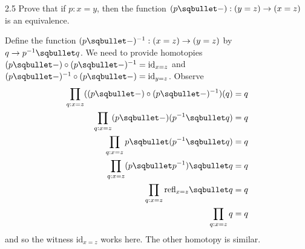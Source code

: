 \documentclass[14pt]{extarticle}
\newcommand{\0}{{\mathbf 0}}
\newcommand{\1}{{\mathbf 1}}
\newcommand{\2}{{\mathbf 2}}
\newcommand{\refl}{\mathrm{refl}}
\newcommand{\id}{\mathrm{id}}
\begin{document}
\begin{prob}{2.5}{}
Prove that if $p : x=y$, then the function $(p \sqbullet -) : (y = z) \to (x = z)$ is an equivalence.
\end{prob}
Define the function $(p \sqbullet - )^{-1} : (x = z) \to (y = z)$ by $q \to p^{-1} \sqbullet q$. We need to provide homotopies $(p \sqbullet -) \circ (p \sqbullet -)^{-1} = \id_{x = z}$ and $(p \sqbullet -)^{-1} \circ (p \sqbullet -) = \id_{y = z}$. Observe 
\begin{align*}
\prod_{q : x = z}((p \sqbullet -) \circ (p \sqbullet -)^{-1})(q) &= q \\
\prod_{q : x = z}(p \sqbullet -)(p^{-1} \sqbullet q)&= q \\
\prod_{q : x = z}p \sqbullet (p^{-1} \sqbullet q)&= q \\
\prod_{q : x = z}(p \sqbullet p^{-1}) \sqbullet q &= q \\
\prod_{q : x = z}\refl_{x=z} \sqbullet q &= q \\
\prod_{q : x = z}q &= q \\
\end{align*}
and so the witness $\id_{x=z}$ works here. The other homotopy is similar.
\end{document}
